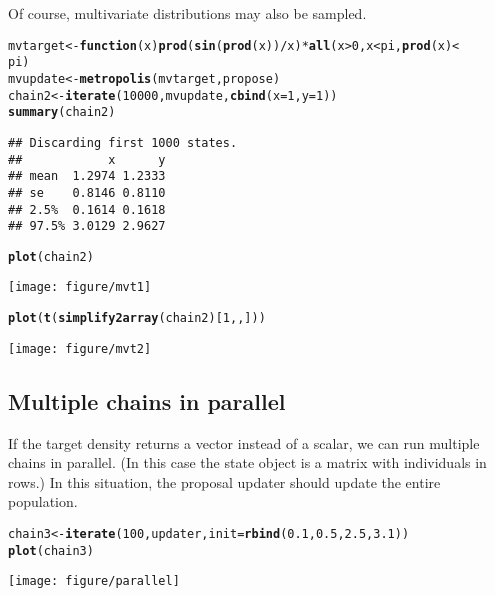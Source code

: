 \documentclass{article}\usepackage[]{graphicx}\usepackage[]{color}
\makeatletter
\def\maxwidth{ %
  \ifdim\Gin@nat@width>\linewidth
    \linewidth
  \else
    \Gin@nat@width
  \fi
}
\newcommand{\hlnum}[1]{\textcolor[rgb]{0.686,0.059,0.569}{#1}}%
\newcommand{\hlopt}[1]{\textcolor[rgb]{0,0,0}{#1}}%
\newcommand{\hlstd}[1]{\textcolor[rgb]{0.345,0.345,0.345}{#1}}%
\newcommand{\hlkwa}[1]{\textcolor[rgb]{0.161,0.373,0.58}{\textbf{#1}}}%
\newcommand{\hlkwb}[1]{\textcolor[rgb]{0.69,0.353,0.396}{#1}}%
\newcommand{\hlkwc}[1]{\textcolor[rgb]{0.333,0.667,0.333}{#1}}%
\newcommand{\hlkwd}[1]{\textcolor[rgb]{0.737,0.353,0.396}{\textbf{#1}}}%
\newenvironment{kframe}{%
 \def\at@end@of@kframe{}%
 \ifinner\ifhmode%
  \def\at@end@of@kframe{\end{minipage}}%
  \begin{minipage}{\columnwidth}%
 \fi\fi%
 \def\FrameCommand##1{\hskip\@totalleftmargin \hskip-\fboxsep
 \colorbox{shadecolor}{##1}\hskip-\fboxsep
     \hskip-\linewidth \hskip-\@totalleftmargin \hskip\columnwidth}%
 \MakeFramed {\advance\hsize-\width
   \@totalleftmargin\z@ \linewidth\hsize
   \@setminipage}}%
 {\par\unskip\endMakeFramed%
 \at@end@of@kframe}
\newenvironment{knitrout}{}{} %
\makeatother
\begin{document}
Of course, multivariate distributions may also be sampled. 
\begin{knitrout}
\color{fgcolor}\begin{kframe}
\begin{alltt}
\hlstd{mvtarget} \hlkwb{<-} \hlkwa{function}\hlstd{(}\hlkwc{x}\hlstd{)} \hlkwd{prod}\hlstd{(}\hlkwd{sin}\hlstd{(}\hlkwd{prod}\hlstd{(x))}\hlopt{/}\hlstd{x)} \hlopt{*} \hlkwd{all}\hlstd{(x} \hlopt{>} \hlnum{0}\hlstd{, x} \hlopt{<} \hlstd{pi,} \hlkwd{prod}\hlstd{(x)} \hlopt{<}
    \hlstd{pi)}
\hlstd{mvupdate} \hlkwb{<-} \hlkwd{metropolis}\hlstd{(mvtarget, propose)}
\hlstd{chain2} \hlkwb{<-} \hlkwd{iterate}\hlstd{(}\hlnum{10000}\hlstd{, mvupdate,} \hlkwd{cbind}\hlstd{(}\hlkwc{x} \hlstd{=} \hlnum{1}\hlstd{,} \hlkwc{y} \hlstd{=} \hlnum{1}\hlstd{))}
\hlkwd{summary}\hlstd{(chain2)}
\end{alltt}
\begin{verbatim}
## Discarding first 1000 states.
##            x      y
## mean  1.2974 1.2333
## se    0.8146 0.8110
## 2.5%  0.1614 0.1618
## 97.5% 3.0129 2.9627
\end{verbatim}
\begin{alltt}
\hlkwd{plot}\hlstd{(chain2)}
\end{alltt}
\end{kframe}
\texttt{[image: figure/mvt1]} 
\begin{kframe}\begin{alltt}
\hlkwd{plot}\hlstd{(}\hlkwd{t}\hlstd{(}\hlkwd{simplify2array}\hlstd{(chain2)[}\hlnum{1}\hlstd{, , ]))}
\end{alltt}
\end{kframe}
\texttt{[image: figure/mvt2]} 

\end{knitrout}


\subsection{Multiple chains in parallel}
If the target density returns a vector instead of a scalar, we can run
multiple chains in parallel. (In this case the state object is a
matrix with individuals in rows.) In this situation, the proposal
updater should update the entire population.
\begin{knitrout}
\color{fgcolor}\begin{kframe}
\begin{alltt}
\hlstd{chain3} \hlkwb{<-} \hlkwd{iterate}\hlstd{(}\hlnum{100}\hlstd{, updater,} \hlkwc{init} \hlstd{=} \hlkwd{rbind}\hlstd{(}\hlnum{0.1}\hlstd{,} \hlnum{0.5}\hlstd{,} \hlnum{2.5}\hlstd{,} \hlnum{3.1}\hlstd{))}
\hlkwd{plot}\hlstd{(chain3)}
\end{alltt}
\end{kframe}
\texttt{[image: figure/parallel]} 

\end{knitrout}
\end{document}
